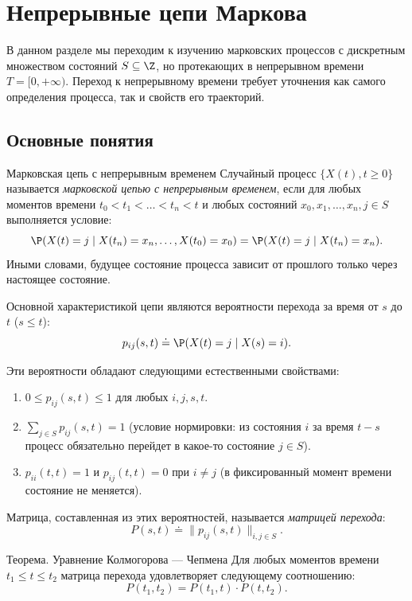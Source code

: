 \section{Непрерывные цепи Маркова}

В данном разделе мы переходим к изучению марковских процессов с дискретным множеством состояний $S \subseteq \Z$, но протекающих в непрерывном времени $T = [0, +\infty)$. Переход к непрерывному времени требует уточнения как самого определения процесса, так и свойств его траекторий.

\subsection{Основные понятия}

\begin{definition}{Марковская цепь с непрерывным временем}
    Случайный процесс $\{X(t), t \geqslant 0\}$ называется \textit{марковской цепью с непрерывным временем}, если для любых моментов времени $t_0 < t_1 < \dots < t_n < t$ и любых состояний $x_0, x_1, \dots, x_n, j \in S$ выполняется условие:
    \[
    \P(X(t) = j \mid X(t_n) = x_n, \dots, X(t_0) = x_0) = \P(X(t) = j \mid X(t_n) = x_n).
    \]
    Иными словами, будущее состояние процесса зависит от прошлого только через настоящее состояние.
\end{definition}

Основной характеристикой цепи являются вероятности перехода за время от $s$ до $t$ ($s \leqslant t$):
\[
p_{ij}(s, t) \doteq \P(X(t) = j \mid X(s) = i).
\]

Эти вероятности обладают следующими естественными свойствами:
\begin{enumerate}
    \item $0 \leqslant p_{ij}(s, t) \leqslant 1$ для любых $i, j, s, t$.
    \item $\sum_{j \in S} p_{ij}(s, t) = 1$ (условие нормировки: из состояния $i$ за время $t-s$ процесс обязательно перейдет в какое-то состояние $j \in S$).
    \item $p_{ii}(t, t) = 1$ и $p_{ij}(t, t) = 0$ при $i \ne j$ (в фиксированный момент времени состояние не меняется).
\end{enumerate}

Матрица, составленная из этих вероятностей, называется \textit{матрицей перехода}:
\[
P(s, t) \doteq \|p_{ij}(s, t)\|_{i, j \in S}.
\]

\begin{theorem}{Теорема. Уравнение Колмогорова — Чепмена}
    Для любых моментов времени $t_1 \leqslant t \leqslant t_2$ матрица перехода удовлетворяет следующему соотношению:
    \[
    P(t_1, t_2) = P(t_1, t) \cdot P(t, t_2).
    \]
\end{theorem}

